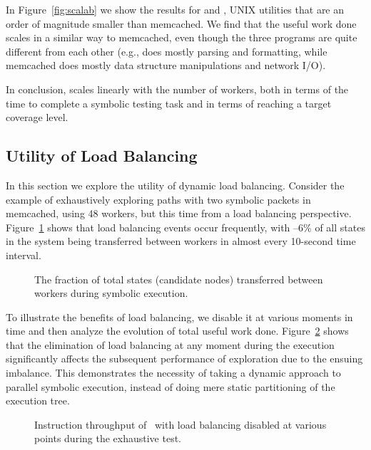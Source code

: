 In Figure~\ref{fig:scalab} we show the results for  and , UNIX utilities that are an order of magnitude smaller than memcached. We find that the useful work done scales in a similar way to memcached, even though the three programs are quite different from each other (e.g.,  does mostly parsing and formatting, while memcached does mostly data structure manipulations and network I/O).


In conclusion, \cnine scales linearly with the number of workers, both in terms of the time to complete a symbolic testing task and in terms of reaching a target coverage level.  %


\iffalse
\subsection{Utility of Load Balancing}
\label{sec:profiling}
 
In this section we explore the utility of dynamic load balancing.  Consider the example of exhaustively exploring paths with two symbolic packets in memcached, using 48 workers, but this time from a load balancing perspective. Figure~\ref{fig:scalab-load-balancing} shows that load balancing events occur frequently, with --6\% of all states in the system being transferred between workers in almost every 10-second time interval.

\begin{figure}
  \centering
  \caption{The fraction of total states (candidate nodes) transferred between workers during symbolic execution.}
  \label{fig:scalab-load-balancing}
\end{figure} 

To illustrate the benefits of load balancing, we disable it at various moments in time and then analyze the evolution of total useful work done. Figure~\ref{fig:scalab-static-balancing} shows that the elimination of load balancing at any moment during the execution significantly affects the subsequent performance of exploration due to the ensuing imbalance.  This demonstrates the necessity of taking a dynamic approach to parallel symbolic execution, instead of doing mere static partitioning of the execution tree.

\begin{figure}
  \centering
  \caption{Instruction throughput of \cnine\ with load balancing disabled at various points during the exhaustive test.}
  \label{fig:scalab-static-balancing}
  \vspace{-0.5cm}
\end{figure}

